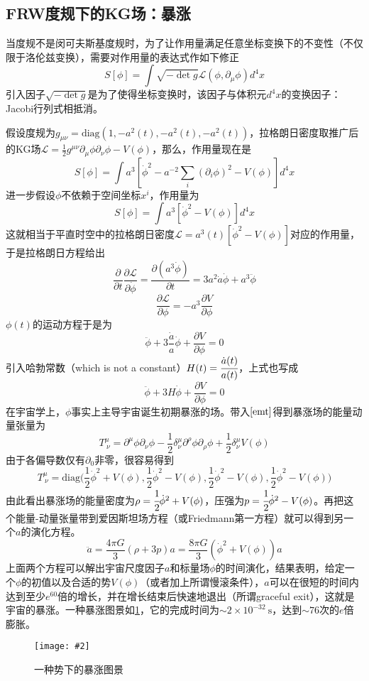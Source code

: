 \documentclass[a4paper,11pt]{ctexart}
\newcommand{\beq}{\begin{equation}}
\newcommand{\eeq}{\end{equation}}
\newcommand{\lag}{\mathcal{L}}
\newcommand{\diag}{\mathrm{diag}}
\newcommand{\cpic}[2]{
\begin{center}
\texttt{[image: \#2]}
\end{center}
}
\newcommand{\cpicn}[3]
{
\begin{figure}[H]
\cpic{#1}{#2}
\caption{#3\label{#2}}
\end{figure}
}
\begin{document}
\subsection{FRW度规下的KG场：暴涨}
当度规不是闵可夫斯基度规时，为了让作用量满足任意坐标变换下的不变性（不仅限于洛伦兹变换），需要对作用量的表达式作如下修正
\beq
S[\phi] = \int \sqrt{ - \det g} \lag(\phi,\partial_\mu \phi) d^4 x
\eeq
引入因子$\sqrt{ - \det g}$是为了使得坐标变换时，该因子与体积元$d^4 x$的变换因子：Jacobi行列式相抵消。
\par
假设度规为$g_{\mu \nu} = \diag(1,-a^2(t),-a^2(t),-a^2(t))$，拉格朗日密度取推广后的KG场$\lag = \frac{1}{2} g^{\mu \nu} \partial_\mu \phi \partial_\nu \phi - V(\phi)$，那么，作用量现在是
\beq
S[\phi] = \int a^3 [\dot{\phi}^2 - a^{-2} \sum_i (\partial_i \phi)^2 - V(\phi)]d^4 x
\eeq
进一步假设$\phi$不依赖于空间坐标$x^i$，作用量为
\beq
S[\phi] = \int a^3[ \dot{\phi}^2 - V(\phi)]d^4 x
\eeq
这就相当于平直时空中的拉格朗日密度$\lag = a^3(t) [\dot{\phi}^2 - V(\phi)]$对应的作用量，于是拉格朗日方程给出
\beq
\frac{\partial}{\partial t} \frac{\partial \lag}{\partial \dot{\phi}} = \frac{\partial (a^3 \dot{\phi})}{\partial t} = 3a^2 \dot{a} \dot{\phi} + a^3 \ddot{\phi}
\eeq
\beq
\frac{\partial \lag}{\partial \phi} = - a^3 \frac{\partial V}{\partial \phi}
\eeq
$\phi (t)$的运动方程于是为
\beq
\ddot{\phi} + 3\frac{\dot{a}}{a} \dot{\phi} + \frac{\partial V}{\partial \phi} = 0
\eeq
引入哈勃常数（which is not a constant）$H(t) = \cfrac{\dot{a}(t)}{a(t)}$，上式也写成
\beq
\ddot{\phi} + 3H \dot{\phi} + \frac{\partial V}{\partial \phi} = 0
\eeq
在宇宙学上，$\phi$事实上主导宇宙诞生初期暴涨的场。带入$\cref{emt}$得到暴涨场的能量动量张量为
\beq
T^\mu_{\ \nu} = \partial^\mu \phi \partial_\nu \phi - \frac{1}{2} \delta^\mu_\nu \partial^\rho \phi \partial_\rho \phi + \frac{1}{2} \delta^\mu_\nu V(\phi)
\eeq
由于各偏导数仅有$\partial_0$非零，很容易得到
\beq
T^\mu_{\ \nu} = \diag \big(\frac{1}{2}\dot{\phi}^2 + V(\phi),\frac{1}{2}\dot{\phi}^2 - V(\phi),\frac{1}{2}\dot{\phi}^2 - V(\phi),\frac{1}{2}\dot{\phi}^2 - V(\phi)\big)
\eeq
由此看出暴涨场的能量密度为$\rho = \cfrac{1}{2}\dot{\phi}^2 + V(\phi)$，压强为$p = \cfrac{1}{2}\dot{\phi}^2 - V(\phi)$。再把这个能量-动量张量带到爱因斯坦场方程（或Friedmann第一方程）就可以得到另一个$a$的演化方程。
\beq
\ddot{a} = \frac{4\pi G}{3} (\rho + 3p)a = \frac{8\pi G}{3} (\dot{\phi}^2 + V(\phi))a
\eeq
上面两个方程可以解出宇宙尺度因子$a$和标量场$\phi$的时间演化，结果表明，给定一个$\phi$的初值以及合适的势$V(\phi)$（或者加上所谓慢滚条件），$a$可以在很短的时间内达到至少$e^{60}$倍的增长，并在增长结束后快速地退出（所谓graceful exit），这就是宇宙的暴涨。一种暴涨图景如\cref{inflation}，它的完成时间为$\sim 2\times 10^{-32} \mathrm{\ s}$，达到$\sim 76$次的$e$倍膨胀。
\cpicn{0.2}{inflation}{一种势下的暴涨图景}
\end{document}
